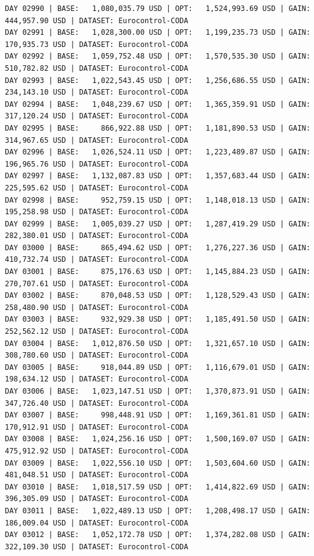 \documentclass[11pt,a4paper]{article}
\begin{document}
\begin{verbatim}
DAY 02990 | BASE:   1,080,035.79 USD | OPT:   1,524,993.69 USD | GAIN: 444,957.90 USD | DATASET: Eurocontrol-CODA
DAY 02991 | BASE:   1,028,300.00 USD | OPT:   1,199,235.73 USD | GAIN: 170,935.73 USD | DATASET: Eurocontrol-CODA
DAY 02992 | BASE:   1,059,752.48 USD | OPT:   1,570,535.30 USD | GAIN: 510,782.82 USD | DATASET: Eurocontrol-CODA
DAY 02993 | BASE:   1,022,543.45 USD | OPT:   1,256,686.55 USD | GAIN: 234,143.10 USD | DATASET: Eurocontrol-CODA
DAY 02994 | BASE:   1,048,239.67 USD | OPT:   1,365,359.91 USD | GAIN: 317,120.24 USD | DATASET: Eurocontrol-CODA
DAY 02995 | BASE:     866,922.88 USD | OPT:   1,181,890.53 USD | GAIN: 314,967.65 USD | DATASET: Eurocontrol-CODA
DAY 02996 | BASE:   1,026,524.11 USD | OPT:   1,223,489.87 USD | GAIN: 196,965.76 USD | DATASET: Eurocontrol-CODA
DAY 02997 | BASE:   1,132,087.83 USD | OPT:   1,357,683.44 USD | GAIN: 225,595.62 USD | DATASET: Eurocontrol-CODA
DAY 02998 | BASE:     952,759.15 USD | OPT:   1,148,018.13 USD | GAIN: 195,258.98 USD | DATASET: Eurocontrol-CODA
DAY 02999 | BASE:   1,005,039.27 USD | OPT:   1,287,419.29 USD | GAIN: 282,380.01 USD | DATASET: Eurocontrol-CODA
DAY 03000 | BASE:     865,494.62 USD | OPT:   1,276,227.36 USD | GAIN: 410,732.74 USD | DATASET: Eurocontrol-CODA
DAY 03001 | BASE:     875,176.63 USD | OPT:   1,145,884.23 USD | GAIN: 270,707.61 USD | DATASET: Eurocontrol-CODA
DAY 03002 | BASE:     870,048.53 USD | OPT:   1,128,529.43 USD | GAIN: 258,480.90 USD | DATASET: Eurocontrol-CODA
DAY 03003 | BASE:     932,929.38 USD | OPT:   1,185,491.50 USD | GAIN: 252,562.12 USD | DATASET: Eurocontrol-CODA
DAY 03004 | BASE:   1,012,876.50 USD | OPT:   1,321,657.10 USD | GAIN: 308,780.60 USD | DATASET: Eurocontrol-CODA
DAY 03005 | BASE:     918,044.89 USD | OPT:   1,116,679.01 USD | GAIN: 198,634.12 USD | DATASET: Eurocontrol-CODA
DAY 03006 | BASE:   1,023,147.51 USD | OPT:   1,370,873.91 USD | GAIN: 347,726.40 USD | DATASET: Eurocontrol-CODA
DAY 03007 | BASE:     998,448.91 USD | OPT:   1,169,361.81 USD | GAIN: 170,912.91 USD | DATASET: Eurocontrol-CODA
DAY 03008 | BASE:   1,024,256.16 USD | OPT:   1,500,169.07 USD | GAIN: 475,912.92 USD | DATASET: Eurocontrol-CODA
DAY 03009 | BASE:   1,022,556.10 USD | OPT:   1,503,604.60 USD | GAIN: 481,048.51 USD | DATASET: Eurocontrol-CODA
DAY 03010 | BASE:   1,018,517.59 USD | OPT:   1,414,822.69 USD | GAIN: 396,305.09 USD | DATASET: Eurocontrol-CODA
DAY 03011 | BASE:   1,022,489.13 USD | OPT:   1,208,498.17 USD | GAIN: 186,009.04 USD | DATASET: Eurocontrol-CODA
DAY 03012 | BASE:   1,052,172.78 USD | OPT:   1,374,282.08 USD | GAIN: 322,109.30 USD | DATASET: Eurocontrol-CODA

\end{verbatim}
\end{document}
